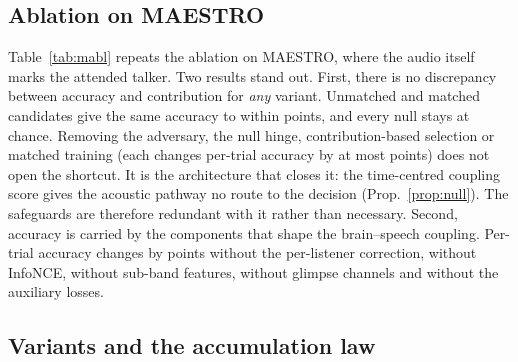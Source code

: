 \documentclass[twoside]{article}
\begin{document}
\FloatBarrier
\subsection{Ablation on MAESTRO}\label{app:mabl}
Table~\ref{tab:mabl} repeats the ablation on
MAESTRO, where the audio itself marks the attended talker. Two results stand out. First,
there is no discrepancy between accuracy and contribution for \emph{any} variant. Unmatched
and matched candidates give the same accuracy to within \maUnmatchedGap{} points, and every
null stays at chance. Removing the adversary, the null hinge, contribution-based selection or
matched training (each changes per-trial accuracy by at most \maSafeMax{} points) does not
open the shortcut. It is the architecture that closes it: the time-centred coupling score
gives the acoustic pathway no route to the decision (Prop.~\ref{prop:null}). The safeguards
are therefore redundant with it rather than necessary. Second, accuracy is carried by the
components that shape the brain--speech coupling. Per-trial accuracy changes by
\maAblRank{} points without the per-listener correction, \maAblNce{} without InfoNCE,
\maAblBanks{} without sub-band features, \maAblGlimpse{} without glimpse channels and
\maAblAux{} without the auxiliary losses.
\begin{table}[h]\centering\small
\caption{Ablation on MAESTRO, where the audio offers a shortcut (the attended talker is always
the loudest): within listeners, seed 0, 4-way. For each variant: 5-s accuracy and
contribution with unmatched candidates (shortcut available) and with matched candidates;
the EEG-shuffle and circular-shift nulls; per-trial accuracy and contribution; and embedding
collapse (mean cosine between windows; 1 = every window alike).}\label{tab:mabl}
\resizebox{\textwidth}{!}{}
\end{table}

\FloatBarrier
\subsection{Variants and the accumulation law}\label{app:lawdetails}
\end{document}
